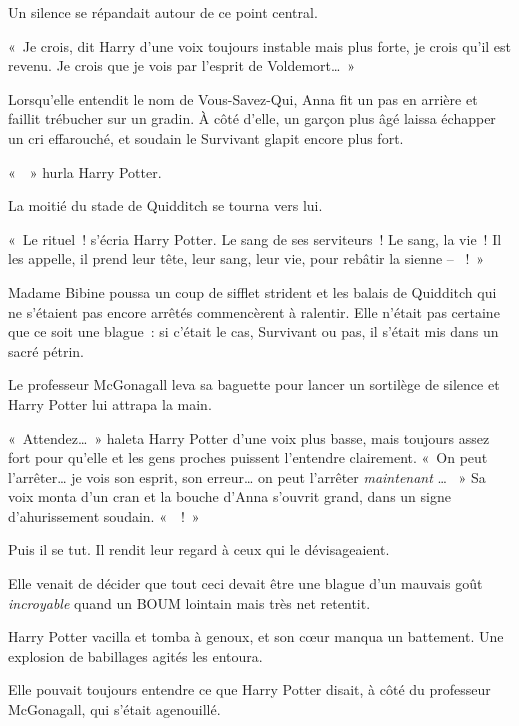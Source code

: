 Un silence se répandait autour de ce point central.

«~Je crois, dit Harry d'une voix toujours instable mais plus forte, je crois qu'il est revenu.
Je crois que je vois par l'esprit de Voldemort…~»

Lorsqu'elle entendit le nom de Vous-Savez-Qui, Anna fit un pas en arrière et faillit trébucher sur un gradin.
À côté d'elle, un garçon plus âgé laissa échapper un cri effarouché, et soudain le Survivant glapit encore plus fort.

«~~» hurla Harry Potter.

La moitié du stade de Quidditch se tourna vers lui.

«~Le rituel~! s'écria Harry Potter.
Le sang de ses serviteurs~!
Le sang, la vie~!
Il les appelle, il prend leur tête, leur sang, leur vie, pour rebâtir la sienne -- ~!~»

Madame Bibine poussa un coup de sifflet strident et les balais de Quidditch qui ne s'étaient pas encore arrêtés commencèrent à ralentir.
Elle n'était pas certaine que ce soit une blague~: si c'était le cas, Survivant ou pas, il s'était mis dans un sacré pétrin.

Le professeur McGonagall leva sa baguette pour lancer un sortilège de silence et Harry Potter lui attrapa la main.

«~Attendez…~»
haleta Harry Potter d'une voix plus basse, mais toujours assez fort pour qu'elle et les gens proches puissent l'entendre clairement.
«~On peut l'arrêter… je vois son esprit, son erreur… on peut l'arrêter \emph{maintenant} …
~» Sa voix monta d'un cran et la bouche d'Anna s'ouvrit grand, dans un signe d'ahurissement soudain.
«~~!~»

Puis il se tut.
Il rendit leur regard à ceux qui le dévisageaient.

Elle venait de décider que tout ceci devait être une blague d'un mauvais goût \emph{incroyable} quand un BOUM lointain mais très net retentit.

Harry Potter vacilla et tomba à genoux, et son cœur manqua un battement.
Une explosion de babillages agités les entoura.

Elle pouvait toujours entendre ce que Harry Potter disait, à côté du professeur McGonagall, qui s'était agenouillé.

